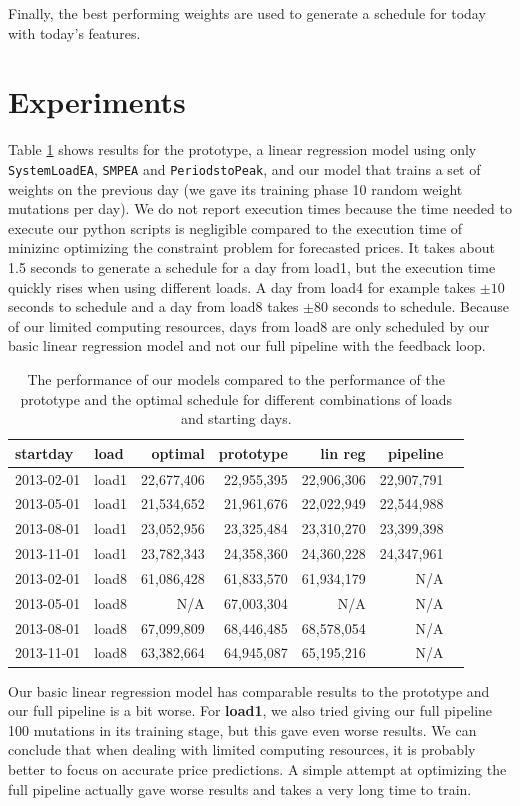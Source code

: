 \documentclass[a4,10pt]{article}
\begin{document}
Finally, the best performing weights are used to generate a schedule for today with today's features.

\section{Experiments}
Table \ref{tab:results} shows results for the prototype, a linear regression model using only \verb|SystemLoadEA|, \verb|SMPEA| and \verb|PeriodstoPeak|, and our model that trains a set of weights on the previous day (we gave its training phase 10 random weight mutations per day). We do not report execution times because the time needed to execute our python scripts is negligible compared to the execution time of minizinc optimizing the constraint problem for forecasted prices. It takes about 1.5 seconds to generate a schedule for a day from load1, but the execution time quickly rises when using different loads. A day from load4 for example takes $\pm 10$ seconds to schedule and a day from load8 takes $\pm 80$ seconds to schedule. Because of our limited computing resources, days from load8 are only scheduled by our basic linear regression model and not our full pipeline with the feedback loop.

\begin{table}
	\begin{tabular}{llrrrrr}
		startday & load &optimal & prototype & lin reg & pipeline \\ \midrule
		2013-02-01 & load1 & 22,677,406& 22,955,395 & 22,906,306 & 22,907,791\\
		2013-05-01 & load1 & 21,534,652& 21,961,676 & 22,022,949 & 22,544,988\\
		2013-08-01 & load1 & 23,052,956& 23,325,484 & 23,310,270 & 23,399,398\\
		2013-11-01 & load1 & 23,782,343& 24,358,360 & 24,360,228 & 24,347,961\\
		2013-02-01 & load8 & 61,086,428& 61,833,570 & 61,934,179 & N/A\\
		2013-05-01 & load8 & N/A& 67,003,304 & N/A & N/A\\
		2013-08-01 & load8 & 67,099,809& 68,446,485 & 68,578,054 & N/A\\
		2013-11-01 & load8 & 63,382,664& 64,945,087 & 65,195,216 & N/A\\
	\end{tabular}
	\caption{The performance of our models compared to the performance of the prototype and the optimal schedule for different combinations of loads and starting days.}
	\label{tab:results}
\end{table}
Our basic linear regression model has comparable results to the prototype and our full pipeline is a bit worse. For \textbf{load1}, we also tried giving our full pipeline 100 mutations in its training stage, but this gave even worse results.
We can conclude that when dealing with limited computing resources, it is probably better to focus on accurate price predictions. A simple attempt at optimizing the full pipeline actually gave worse results and takes a very long time to train. 
\end{document}
